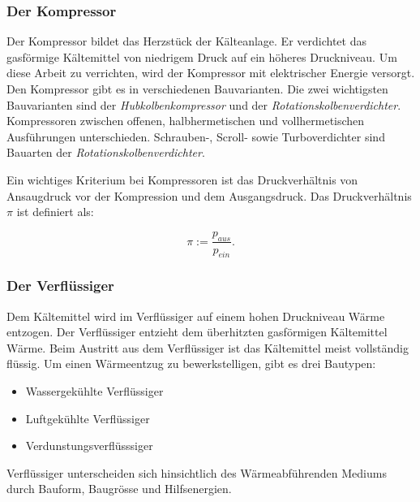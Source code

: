 \subsubsection*{Der Kompressor}
Der Kompressor bildet das Herzstück der Kälteanlage. Er verdichtet das gasförmige Kältemittel von niedrigem Druck auf ein höheres Druckniveau. Um diese Arbeit zu verrichten, wird der Kompressor mit elektrischer Energie versorgt. Den Kompressor gibt es in verschiedenen Bauvarianten. Die zwei wichtigsten Bauvarianten sind der \textit{Hubkolbenkompressor} und der \textit{Rotationskolbenverdichter}. Kompressoren zwischen offenen, halbhermetischen und vollhermetischen Ausführungen unterschieden. Schrauben-, Scroll- sowie Turboverdichter sind Bauarten der \textit{Rotationskolbenverdichter}. 



Ein wichtiges Kriterium bei Kompressoren ist das Druckverhältnis von Ansaugdruck vor der Kompression und dem Ausgangsdruck. Das Druckverhältnis $\pi$ ist definiert als:



\begin{equation}
\pi := \frac{p_{aus}}{p_{ein}}.
\label{Druckverhältnis}
\end{equation}

\subsubsection*{Der Verflüssiger}

Dem Kältemittel wird im Verflüssiger auf einem hohen Druckniveau Wärme entzogen. Der Verflüssiger entzieht dem überhitzten gasförmigen Kältemittel Wärme. Beim Austritt aus dem Verflüssiger ist das Kältemittel meist vollständig flüssig. 
Um einen Wärmeentzug zu bewerkstelligen, gibt es drei Bautypen:

\begin{itemize}
\item Wassergekühlte Verflüssiger
\item Luftgekühlte Verflüssiger
\item Verdunstungsverflüsssiger
\end{itemize}

Verflüssiger unterscheiden sich hinsichtlich des Wärmeabführenden Mediums durch Bauform, Baugrösse und Hilfsenergien.



